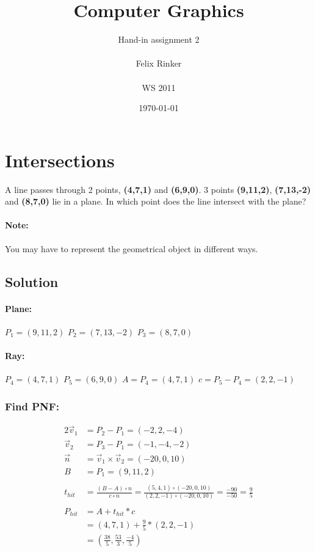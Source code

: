 \documentclass[12pt,fleqn,reqno]{article}
\title{Computer Graphics}
\author{
	Hand-in assignment 2\\
	\\
	Felix Rinker\\
	\\
	WS 2011
}
\date{\today}
\begin{document}
\maketitle


\section{Intersections}
A line passes through 2 points, \textbf{(4,7,1)} and \textbf{(6,9,0)}.
3 points  \textbf{(9,11,2)},  \textbf{(7,13,-2)} and  \textbf{(8,7,0)} lie in a plane.
In which point does the line intersect with the plane?
\paragraph{Note:} You may have to represent the geometrical object in different ways.

\subsection{Solution}

\paragraph{Plane:}
\(P_1 = (9,11,2) \)
\(P_2 = (7,13,-2) \)
\(P_3 = (8,7,0) \)

\paragraph{Ray:}
\(P_4 = (4,7,1) \)
\(P_5 = (6,9,0) \)
\(A = P_4 = (4,7,1) \)
\(c = P_5 - P_4 = (2,2,-1) \)

\setlength{\mathindent}{0pt}

\subsubsection{Find PNF:}
\begin{alignat*}{2}
\vec{v}_1 	&= P_2 - P_1 = (-2,2,-4) \\
\vec{v}_2 	&= P_3 - P_1 = (-1,-4,-2) \\
\vec{n} 	&= \vec{v}_1 \times \vec{v}_2 = (-20, 0, 10) \\
	B &= P_1 	= (9,11,2)
	\\ 
	\\
	t_{hit} &= \frac{(B-A) \circ n} {c \circ n} = \frac{(5,4,1) \circ (-20, 0, 10)} {(2,2,-1) \circ (-20, 0, 10)} = \frac{-90} {-50} = \frac{9} {5}
	\\
	\\
	P_{hit}& = A + t_{hit} * c\\
	&= (4,7,1) + \frac{9} {5} * (2,2,-1)
	\\
	&= ( \frac{38}{5}, \frac{53}{3}, \frac{-4}{5})
\end{alignat*}
\end{document}
